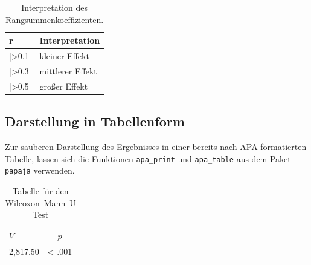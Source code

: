 \documentclass[
]{book}
\newenvironment{Shaded}{\begin{snugshade}}{\end{snugshade}}
\newcommand{\AttributeTok}[1]{\textcolor[rgb]{0.13,0.29,0.53}{#1}}
\newcommand{\FunctionTok}[1]{\textcolor[rgb]{0.13,0.29,0.53}{\textbf{#1}}}
\newcommand{\NormalTok}[1]{#1}
\newcommand{\OtherTok}[1]{\textcolor[rgb]{0.56,0.35,0.01}{#1}}
\newcommand{\SpecialCharTok}[1]{\textcolor[rgb]{0.81,0.36,0.00}{\textbf{#1}}}
\newcommand{\StringTok}[1]{\textcolor[rgb]{0.31,0.60,0.02}{#1}}
\begin{document}
\begin{table}[tbp]

\begin{center}
\begin{threeparttable}

\caption{\label{tab:unnamed-chunk-281}Interpretation des Rangsummenkoeffizienten.}

\begin{tabular}{ll}
\toprule
r & \multicolumn{1}{c}{Interpretation}\\
\midrule
|>0.1| & kleiner Effekt\\
|>0.3| & mittlerer Effekt\\
|>0.5| & großer Effekt\\
\bottomrule
\end{tabular}

\end{threeparttable}
\end{center}

\end{table}

\subsection{Darstellung in Tabellenform}\label{darstellung-in-tabellenform-4}

Zur sauberen Darstellung des Ergebnisses in einer bereits nach APA formatierten Tabelle, lassen sich die Funktionen \texttt{apa\_print} und \texttt{apa\_table} aus dem Paket \texttt{papaja} verwenden.

\begin{Shaded}
\end{Shaded}

\begin{table}[tbp]

\begin{center}
\begin{threeparttable}

\caption{\label{tab:unnamed-chunk-282}Tabelle für den Wilcoxon–Mann–U Test}

\begin{tabular}{ll}
\toprule
$V$ & \multicolumn{1}{c}{$p$}\\
\midrule
2,817.50 & < .001\\
\bottomrule
\end{tabular}

\end{threeparttable}
\end{center}

\end{table}
\end{document}
